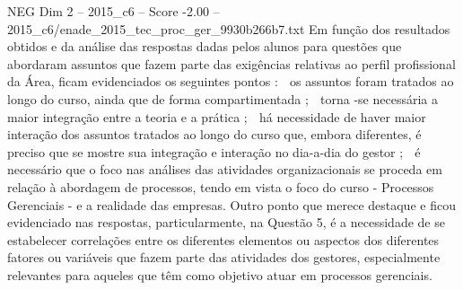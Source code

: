 \begin{textsample}{NEG Dim 2 – 2015\_c6 – Score -2.00 – 2015\_c6/enade\_2015\_tec\_proc\_ger\_9930b266b7.txt}
Em função dos resultados obtidos e da análise das respostas dadas pelos alunos para questões que abordaram assuntos que fazem parte das exigências relativas ao perfil profissional da Área, ficam evidenciados os seguintes pontos :  os assuntos foram tratados ao longo do curso, ainda que de forma compartimentada ;  torna -se necessária a maior integração entre a teoria e a prática ;  há necessidade de haver maior interação dos assuntos tratados ao longo do curso que, embora diferentes, é preciso que se mostre sua integração e interação no dia-a-dia do gestor ;  é necessário que o foco nas análises das atividades organizacionais se proceda em relação à abordagem de processos, tendo em vista o foco do curso - Processos Gerenciais - e a realidade das empresas.
Outro ponto que merece destaque e ficou evidenciado nas respostas, particularmente, na Questão 5, é a necessidade de se estabelecer correlações entre os diferentes elementos ou aspectos dos diferentes fatores ou variáveis que fazem parte das atividades dos gestores, especialmente relevantes para aqueles que têm como objetivo atuar em processos gerenciais.

\end{textsample}
